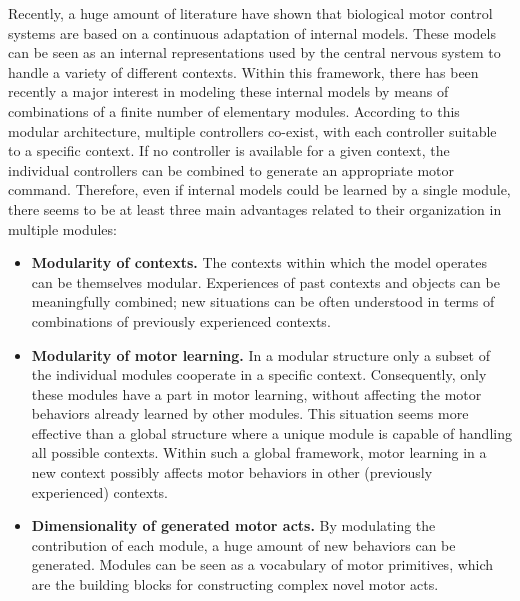 \documentclass{svmult}
\begin{document}
Recently, a huge amount of literature have shown that 
biological motor control systems are based on a continuous
adaptation of internal models. These models can be seen as
an internal representations used by the central nervous system
to handle a variety of different contexts. Within this framework, there has been recently a major interest 
in modeling these internal models by means of combinations of a finite 
number of elementary modules. According to this modular architecture, 
multiple controllers co-exist, with each controller suitable to a 
specific context. If no controller is available for a given 
context, the individual controllers can be combined to generate 
an appropriate motor command. Therefore, even if internal models could be
learned by a single module, there seems to be at least three main
advantages \cite{WolpertKawato1998} related to their organization 
in multiple modules:

\begin{itemize}

\item \textbf{Modularity of contexts.} The contexts within which the model operates
can be themselves modular. Experiences of past contexts and objects
can be meaningfully combined; new situations can be often understood
in terms of combinations of previously experienced contexts.

\item \textbf{Modularity of motor learning.} In a modular structure only a subset
of the individual modules cooperate in a specific context.
Consequently, only these modules have a part in motor learning,
without affecting the motor behaviors already learned by other
modules. This situation seems more effective than a global structure
where a unique module is capable of handling all possible contexts.
Within such a global framework, motor learning in a new context
possibly affects motor behaviors in other (previously experienced)
contexts.

\item \textbf{Dimensionality of generated motor acts.} By modulating 
the contribution of each module, a huge amount of new behaviors can 
be generated. Modules can be seen as a vocabulary 
of motor primitives, which are the building blocks for constructing 
complex novel motor acts.
 
\end{itemize}
\end{document}
